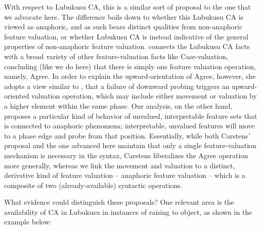 \documentclass[output=paper
,modfonts
,nonflat
]{langsci/langscibook}
\begin{document}
With respect to Lubukusu CA, this is a similar sort of proposal to the one that we advocate here. The difference boils down to whether this Lubukusu CA is viewed as anaphoric, and as such bears distinct qualities from non-anaphoric feature valuation, or whether Lubukusu CA is instead indicative of the general properties of non-anaphoric feature valuation. \citet{Carstens:2016} connects the Lubukusu CA facts with a broad variety of other feature-valuation facts like Case-valuation, concluding (like we do here) that there is simply one feature valuation operation, namely, Agree.  In order to explain the upward-orientation of Agree, however, she adopts a view similar to \citet{Bejar:2009}, that a failure of downward probing triggers an upward-oriented valuation operation, which may include either movement or valuation by a higher element within the same phase. Our analysis, on the other hand, proposes a particular kind of behavior of unvalued, interpretable feature sets that is connected to anaphoric phenomena; interpretable, unvalued features will move to a phase edge and probe from that position. Essentially, while both Carstens’ proposal and the one advanced here maintain that only a single feature-valuation mechanism is necessary in the syntax, Carstens liberalizes the Agree operation more generally, whereas we link the movement and valuation to a distinct, derivative kind of feature valuation -- anaphoric feature valuation -- which is a composite of two (already-available) syntactic operations.

What evidence could distinguish these proposals? One relevant area is the availability of CA in Lubukusu in instances of raising to object, as shown in the example below: 
\end{document}
